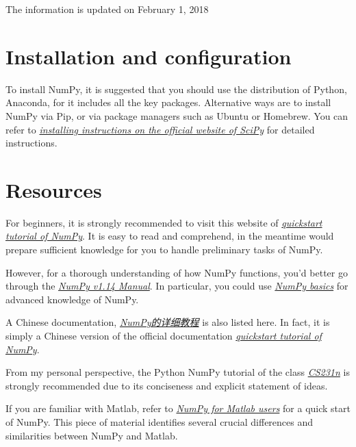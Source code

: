 \documentclass[english]{../TeXTemplate/pkupaper}
\title{\titlemark}
\author{Yixuan Wang}
\date{\today}
\begin{document}
\maketitle

The information is updated on February 1, 2018

\section{Installation and configuration}

To install NumPy, it is suggested that you should use the distribution of Python, Anaconda, for it includes all the key packages. Alternative ways are to install NumPy via Pip, or via package managers such as Ubuntu or Homebrew. You can refer to \href{https://scipy.org/install.html}{\emph{installing instructions on the official website of SciPy}} for detailed instructions. 

\section{Resources}
For beginners, it is strongly recommended to visit this website of \href{https://docs.scipy.org/doc/numpy/user/quickstart.html}{\emph{quickstart tutorial of NumPy}}. It is easy to read and comprehend, in the meantime would prepare sufficient knowledge for you to handle preliminary tasks of NumPy.

However, for a thorough understanding of how NumPy functions, you'd better go through the \href{https://docs.scipy.org/doc/numpy/index.html}{\emph{NumPy v1.14 Manual}}. In particular, you could use \href{https://docs.scipy.org/doc/numpy/user/basics.html}{\emph{NumPy basics}} for advanced knowledge of NumPy.

A Chinese documentation, \href{https://blog.csdn.net/chen_shiqiang/article/details/51868115}{\emph{NumPy的详细教程}} is also listed here. In fact, it is simply a Chinese version of the official documentation \href{https://docs.scipy.org/doc/numpy/user/quickstart.html}{\emph{quickstart tutorial of NumPy}}.

From my personal perspective, the Python NumPy tutorial of the class \href{https://cs231n.github.io/python-numpy-tutorial/}{\emph{CS231n}} is strongly recommended due to its conciseness and explicit statement of ideas.

If you are familiar with Matlab, refer to \href{https://docs.scipy.org/doc/numpy/user/numpy-for-matlab-users.html}{\emph{NumPy for Matlab users}} for a quick start of NumPy. This piece of material identifies several crucial differences and similarities between NumPy and Matlab.
\end{document}

